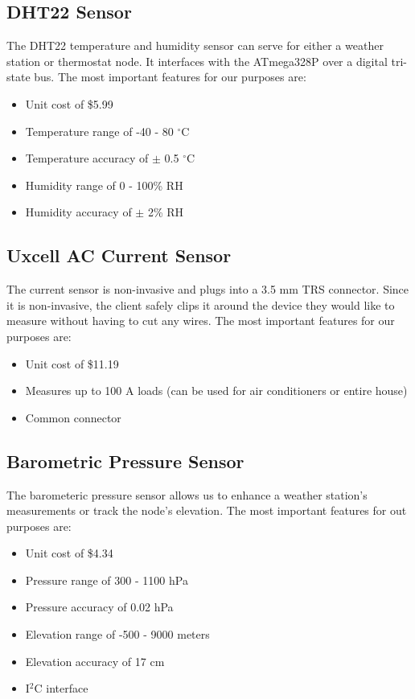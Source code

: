 		\subsection{DHT22 Sensor}
			The DHT22 temperature and humidity sensor can serve for either a weather station or thermostat node. It interfaces with the ATmega328P over a digital tri-state bus. The most important features for our purposes are:
			\begin{itemize}
				\item Unit cost of \$5.99
				\item Temperature range of -40 - 80 $^\circ$C
				\item Temperature accuracy of $\pm$ 0.5 $^\circ$C
				\item Humidity range of 0 - 100\% RH
				\item Humidity accuracy of $\pm$ 2\% RH
			\end{itemize}
		
		\subsection{Uxcell AC Current Sensor}
			The current sensor is non-invasive and plugs into a 3.5 mm TRS connector. Since it is non-invasive, the client safely clips it around the device they would like to measure without having to cut any wires. The most important features for our purposes are:
			\begin{itemize}
				\item Unit cost of \$11.19
				\item Measures up to 100 A loads (can be used for air conditioners or entire house)
				\item Common connector
			\end{itemize}
		
		\subsection{Barometric Pressure Sensor}
			The barometeric pressure sensor allows us to enhance a weather station's measurements or track the node's elevation. The most important features for out purposes are:
			\begin{itemize}
				\item Unit cost of \$4.34
				\item Pressure range of 300 - 1100 hPa
				\item Pressure accuracy of 0.02 hPa
				\item Elevation range of -500 - 9000 meters
				\item Elevation accuracy of 17 cm
				\item I$^2$C interface
			\end{itemize}
		
